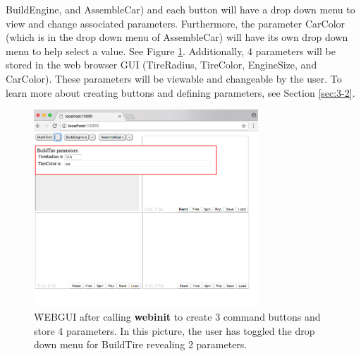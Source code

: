 BuildEngine, and AssembleCar) and each button will have a drop down menu to view and change associated parameters.
Furthermore, the parameter CarColor (which is in the drop down menu of AssembleCar) will have its own drop down
menu to help select a value. See Figure \ref{fig:3}. Additionally, 4 parameters will be stored in the web browser GUI
(TireRadius, TireColor, EngineSize, and CarColor). These parameters will be viewable and changeable by the user.
To learn more about creating buttons and defining parameters, see Section \ref{sec:3-2}.
\begin{figure}[b!]
\centering
\includegraphics[width=0.75\textwidth]{pix/buttons.png}
\caption{\f{WEBGUI} after calling \textbf{webinit} to create 3 command buttons and store 4 parameters. In this picture,
the user has toggled the drop down menu for BuildTire revealing 2 parameters.}
\label{fig:3}
\end{figure}

\newpage
